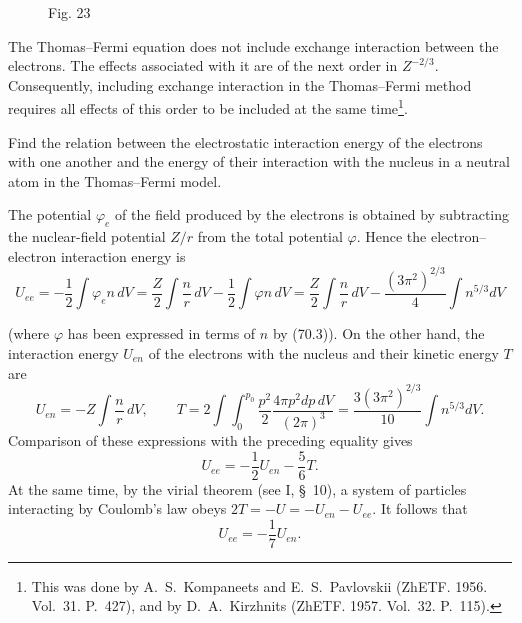 \begin{figure}[ht]
\centering
{}
\caption*{Fig. 23}
\end{figure}

The Thomas--Fermi equation does not include exchange interaction between the electrons. The effects associated with it are of the next order in $Z^{-2/3}$. Consequently, including exchange interaction in the Thomas--Fermi method requires all effects of this order to be included at the same time\footnote{This was done by A.~S.~Kompaneets and E.~S.~Pavlovskii (ZhETF. 1956. Vol.~31. P.~427), and by D.~A.~Kirzhnits (ZhETF. 1957. Vol.~32. P.~115).}.

\ProblemHeading Find the relation between the electrostatic interaction energy of the electrons with one another and the energy of their interaction with the nucleus in a neutral atom in the Thomas--Fermi model.

\SolutionHeading The potential $\varphi_e$ of the field produced by the electrons is obtained by subtracting the nuclear-field potential $Z/r$ from the total potential $\varphi$. Hence the electron--electron interaction energy is
\[
 U_{ee}=-\frac12\int\varphi_en\,dV=\frac Z2\int\frac nr\,dV-\frac12\int\varphi n\,dV
 =\frac Z2\int\frac nr\,dV-\frac{(3\pi^2)^{2/3}}4\int n^{5/3}dV
\]

(where $\varphi$ has been expressed in terms of $n$ by (70.3)). On the other hand, the interaction energy $U_{en}$ of the electrons with the nucleus and their kinetic energy $T$ are
\[
 U_{en}=-Z\int\frac nr\,dV,\qquad T=2\int\!\int_0^{p_0}\frac{p^2}{2}\frac{4\pi p^2dp\,dV}{(2\pi)^3}=\frac{3(3\pi^2)^{2/3}}{10}\int n^{5/3}dV.
\]
Comparison of these expressions with the preceding equality gives
\[
 U_{ee}=-\frac12U_{en}-\frac56T.
\]
At the same time, by the virial theorem (see I, \S~10), a system of particles interacting by Coulomb's law obeys $2T=-U=-U_{en}-U_{ee}$. It follows that
\[
 U_{ee}=-\frac17U_{en}.
\]
